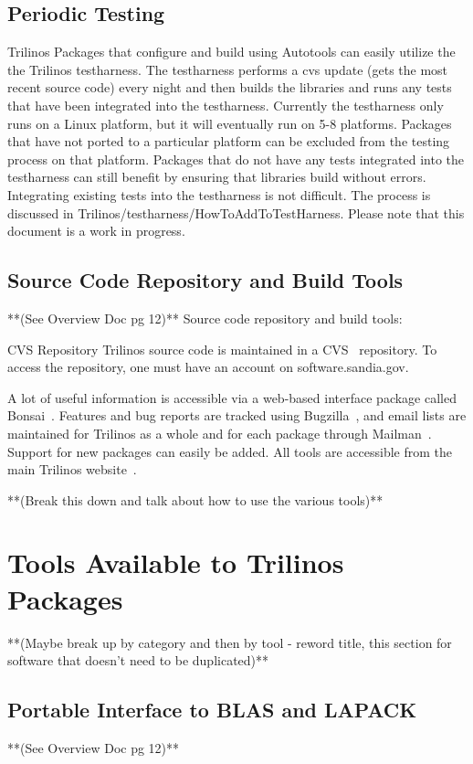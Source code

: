 \documentclass[12pt,relax]{TrilinosDevGuide}
\begin{document}
	\section{Periodic Testing}
Trilinos Packages that configure and build using Autotools can easily 
utilize the the Trilinos testharness.  The testharness performs a cvs update
(gets the most recent source code) every night and then builds the libraries
and runs any tests that have been integrated into the testharness.  
Currently the testharness only runs on a Linux platform, but it will 
eventually run on 5-8 platforms.  Packages that have not ported to a 
particular platform can be excluded from the testing process on that 
platform.  Packages that do not have any tests integrated into the 
testharness can still benefit by ensuring that libraries build without 
errors.  Integrating existing tests into the testharness is not difficult.  
The process is discussed in Trilinos/testharness/HowToAddToTestHarness.  
Please note that this document is a work in progress.

	\section{Source Code Repository and Build Tools}
	**(See Overview Doc pg 12)**
Source code repository and build tools: 

\triangleright CVS Repository
Trilinos source code is maintained in a CVS~\cite{CVS} repository.  To 
access the repository, one must have an account on software.sandia.gov.

A lot of useful information is accessible via a
web-based interface package called Bonsai~\cite{Bonsai}.  Features and bug 
reports are tracked using Bugzilla~\cite{Bugzilla}, and email lists are
maintained for Trilinos as a whole and for each package through 
Mailman~\cite{Mailman}.  Support for new packages can easily be added.  All 
tools are accessible from the main Trilinos website~\cite{Trilinos-home-page}.


**(Break this down and talk about how to use the various tools)**

	\chapter{Tools Available to Trilinos Packages}
	**(Maybe break up by category and then by tool - reword title, this section for software that doesn't need to be duplicated)**
	\section{Portable Interface to BLAS and LAPACK}
	**(See Overview Doc pg 12)**
\end{document}

